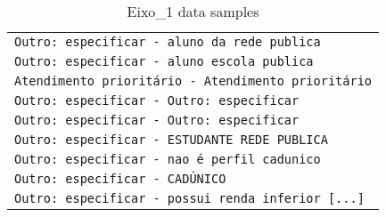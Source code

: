 \begin{table}[h]
\begin{minipage}{.6\linewidth}
\begin{tabular}{@{}l@{}}
\verb|Outro: especificar - aluno da rede publica|        \\
\verb|Outro: especificar - aluno escola publica|         \\
\verb|Atendimento prioritário - Atendimento prioritário| \\
\verb|Outro: especificar - Outro: especificar|           \\
\verb|Outro: especificar - Outro: especificar|           \\
\verb|Outro: especificar - ESTUDANTE REDE PUBLICA|       \\
\verb|Outro: especificar - nao é perfil cadunico|        \\
\verb|Outro: especificar - CADÚNICO|                     \\
\verb|Outro: especificar - possui renda inferior [...]|  \\ \bottomrule
\end{tabular}
\end{minipage}
\caption{Eixo\_1 data samples}
\label{tab:appendix:ngramanalysis:table1}
\end{table}
